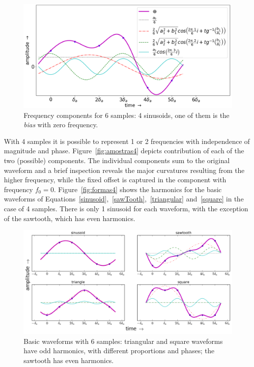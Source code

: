 \begin{figure}[!h!]
    \centering
        \includegraphics[width=.7\textwidth]{figures/amostras6__}
    \caption{Frequency components for 6 samples: 4 sinusoids, one of them is the \emph{bias} with zero frequency.}
        \label{fig:amostras6}
\end{figure}

With 4 samples it is possible to represent 1 or 2 frequencies with independence of magnitude and phase.
Figure~\ref{fig:amostras4} depicts contribution of each of the two (possible) components.
The individual components sum to the original waveform and a brief inspection reveals 
the major curvatures resulting from the higher frequency,
while the fixed offset is captured in the component with frequency $f_0=0$.
Figure~\ref{fig:formas4} shows the harmonics for the basic waveforms of 
Equations~\ref{sinusoid},~\ref{sawTooth},~\ref{triangular} and~\ref{square}
in the case of 4 samples.
There is only 1 sinusoid for each waveform, with the exception of the sawtooth, which has even harmonics.

\begin{figure}[!h!]
    \centering
        \includegraphics[width=.9\textwidth]{figures/amostras6formas___}
    \caption{Basic waveforms with 6 samples: triangular and square waveforms have odd harmonics, with different proportions and phases; the sawtooth has even harmonics.}
        \label{fig:formas6}
\end{figure}

